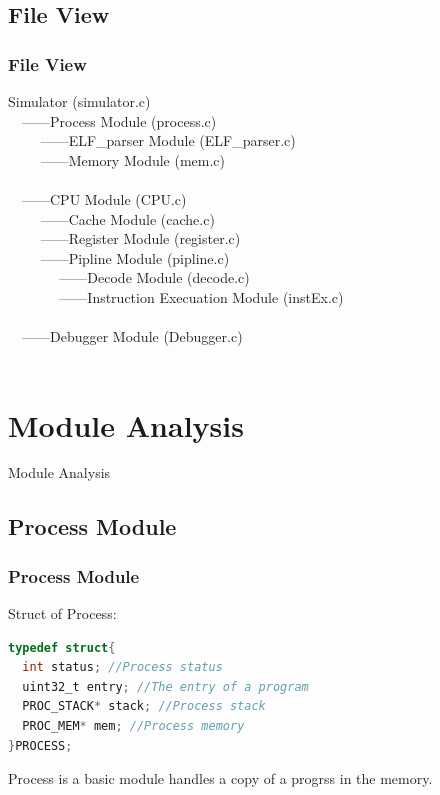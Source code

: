 \documentclass[CJK]{beamer}
\begin{document}
\begin{CJK}{UTF8}{gbsn}
\subsection{File View}
\begin{frame}
  \frametitle{File View}
Simulator (simulator.c)\\
~~\textbar ------Process Module (process.c)\\
~~\textbar ~~ \textbar ------ELF\_parser Module (ELF\_parser.c)\\
~~\textbar ~~ \textbar ------Memory Module (mem.c)\\
~~\textbar\\
~~\textbar ------CPU Module (CPU.c)\\
~~\textbar ~~ \textbar ------Cache Module (cache.c)\\
~~\textbar ~~ \textbar ------Register Module (register.c)\\
~~\textbar ~~ \textbar ------Pipline Module (pipline.c)\\
~~\textbar ~~ \textbar ~~ \textbar ------Decode Module (decode.c)\\
~~\textbar ~~ \textbar ~~ \textbar ------Instruction Execuation Module (instEx.c)\\
~~\textbar\\
~~\textbar ------Debugger Module (Debugger.c)\\
~~\textbar
\end{frame}

\section{Module Analysis}

\begin{frame}
  \huge{Module Analysis}
\end{frame}

\subsection{Process Module}
\begin{frame}[fragile]
  \frametitle{Process Module}
  Struct of Process:
\begin{lstlisting}[language={C}]
typedef struct{
  int status; //Process status
  uint32_t entry; //The entry of a program
  PROC_STACK* stack; //Process stack
  PROC_MEM* mem; //Process memory
}PROCESS;
\end{lstlisting}
  Process is a basic module handles a copy of a progrss in the memory.
\end{frame}


\end{CJK}
\end{document}
